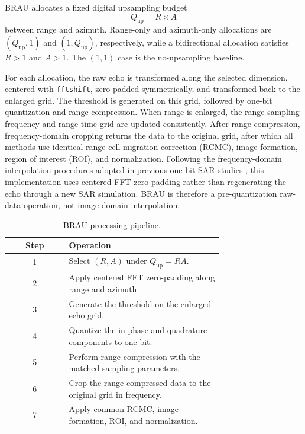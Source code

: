 \documentclass[conference]{IEEEtran}
\begin{document}
BRAU allocates a fixed digital upsampling budget
\begin{equation}
    Q_{\mathrm{up}}=R\times A
\end{equation}
between range and azimuth. Range-only and azimuth-only allocations are $(Q_{\mathrm{up}},1)$ and $(1,Q_{\mathrm{up}})$, respectively, while a bidirectional allocation satisfies $R>1$ and $A>1$. The $(1,1)$ case is the no-upsampling baseline.

For each allocation, the raw echo is transformed along the selected dimension, centered with \texttt{fftshift}, zero-padded symmetrically, and transformed back to the enlarged grid. The threshold is generated on this grid, followed by one-bit quantization and range compression. When range is enlarged, the range sampling frequency and range-time grid are updated consistently. After range compression, frequency-domain cropping returns the data to the original grid, after which all methods use identical range cell migration correction (RCMC), image formation, region of interest (ROI), and normalization. Following the frequency-domain interpolation procedures adopted in previous one-bit SAR studies \cite{zhao2019onebit,nie2025fixed}, this implementation uses centered FFT zero-padding rather than regenerating the echo through a new SAR simulation. BRAU is therefore a pre-quantization raw-data operation, not image-domain interpolation.

\begin{table}[t]
\caption{BRAU processing pipeline.}
\label{tab:brau_pipeline}
\centering
\scriptsize
\setlength{\tabcolsep}{3pt}
\begin{tabular}{c p{0.72\linewidth}}
\hline
Step & Operation \\
\hline
1 & Select $(R,A)$ under $Q_{\mathrm{up}}=RA$. \\
2 & Apply centered FFT zero-padding along range and azimuth. \\
3 & Generate the threshold on the enlarged echo grid. \\
4 & Quantize the in-phase and quadrature components to one bit. \\
5 & Perform range compression with the matched sampling parameters. \\
6 & Crop the range-compressed data to the original grid in frequency. \\
7 & Apply common RCMC, image formation, ROI, and normalization. \\
\hline
\end{tabular}
\end{table}
\end{document}

